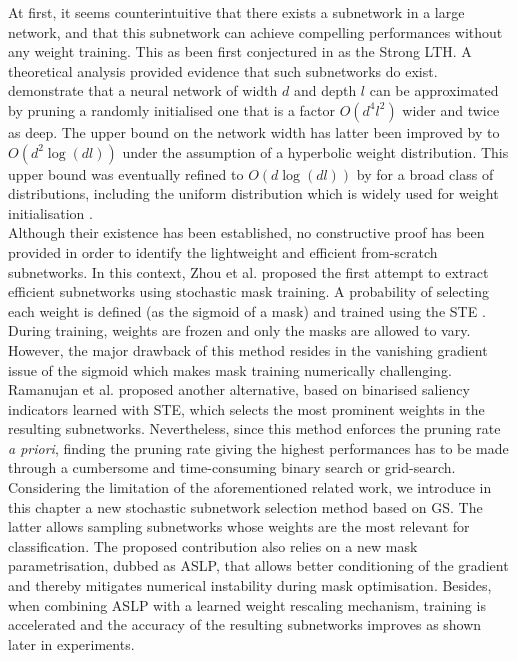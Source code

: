 At first, it seems counterintuitive that there exists a subnetwork in a large
network, and that this subnetwork can achieve compelling performances without
any weight training. This as been first conjectured in
\cite{DBLP:conf/cvpr/RamanujanWKFR20} as the Strong \ac{LTH}. A theoretical
analysis provided evidence that such subnetworks do exist.
\cite{DBLP:conf/icml/MalachYSS20} demonstrate that a neural network of width $d$
and depth $l$ can be approximated by pruning a randomly initialised one that is
a factor $O(d^4l^2)$ wider and twice as deep. The  upper bound on the network
width has latter been improved by \cite{DBLP:conf/nips/OrseauHR20} to
$O(d^2\log(dl))$ under the assumption of a hyperbolic weight distribution. This
upper bound was eventually refined to $O(d\log(dl))$ by
\cite{DBLP:conf/nips/PensiaRNVP20} for a broad class of distributions, including
the uniform distribution which is widely used for weight initialisation \cite{DBLP:conf/iccv/HeZRS15}.\\

Although their existence has been established, no constructive proof has been
provided in order to identify the lightweight and efficient from-scratch
subnetworks. In this context, Zhou et al. \cite{DBLP:conf/nips/ZhouLLY19}
proposed the first attempt to extract efficient subnetworks using stochastic
mask training. A probability of selecting each weight is defined (as the sigmoid
of a mask) and trained using the \ac{STE} \cite{DBLP:journals/corr/BengioLC13}.
During training, weights are frozen and only the masks are allowed to vary.
However, the major drawback of this method resides in the vanishing gradient
issue of the sigmoid which makes mask training numerically challenging.
Ramanujan et al. \cite{DBLP:conf/cvpr/RamanujanWKFR20} proposed another
alternative, based on binarised saliency indicators learned with \ac{STE}, which
selects the most prominent weights in the resulting subnetworks. Nevertheless,
since this method enforces the pruning rate \textit{a priori}, finding the pruning
rate giving the highest performances has to be made through a cumbersome and
time-consuming binary search or grid-search. \\ 

Considering the limitation of the aforementioned related work, we introduce in
this chapter a new stochastic subnetwork selection method based on \ac{GS}.
The latter allows sampling subnetworks whose weights are the most relevant for
classification. The proposed contribution also relies on a new mask
parametrisation, dubbed as \ac{ASLP}, that allows better conditioning of the
gradient and thereby mitigates numerical instability during mask optimisation.
Besides, when combining \ac{ASLP} with a learned weight rescaling mechanism,
training is accelerated and the accuracy of the resulting subnetworks improves
as shown later in experiments.

